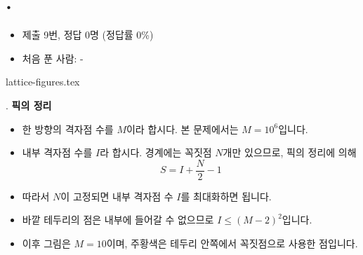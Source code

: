 
\section{\texorpdfstring{\pletter. \ptitle}{문제 \pletter}}

\begin{frame}[label=problem-D]
    \sectiontitle{\pletter}{\ptitle}
    \begin{itemize}
        \item 제출 9번, 정답 0명 (정답률 0\%)
        \item 처음 푼 사람: -
    \end{itemize}
\end{frame}

{lattice-figures.tex}

\begin{frame}{\textbf{\pletter}. \ptitle}
    \textbf{픽의 정리}
    \begin{itemize}
        \item 한 방향의 격자점 수를 $M$이라 합시다. 본 문제에서는 $M=10^6$입니다.
        \item 내부 격자점 수를 $I$라 합시다. 경계에는 꼭짓점 $N$개만 있으므로, 픽의 정리에 의해
        \[
            S=I+\frac{N}{2}-1
        \]
        \item 따라서 $N$이 고정되면 내부 격자점 수 $I$를 최대화하면 됩니다.
        \item 바깥 테두리의 점은 내부에 들어갈 수 없으므로 $I\le(M-2)^2$입니다.
        \item 이후 그림은 $M=10$이며, 주황색은 테두리 안쪽에서 꼭짓점으로 사용한 점입니다.
    \end{itemize}
\end{frame}

